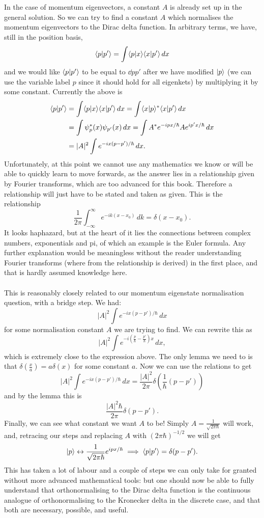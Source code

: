 \\\\
In the case of momentum eigenvectors, a constant $A$ is already set up in the general solution. So we can try to find a constant $A$ which normalises the momentum eigenvectors to the Dirac delta function. In arbitrary terms, we have, still in the position basis,
$$
\langle p|p'\rangle=\int\langle p|x\rangle\langle x|p'\rangle\,dx
$$
and we would like $\langle p|p'\rangle$ to be equal to $\dd{p}{p'}$ after we have modified $|p\rangle$ (we can use the variable label $p$ since it should hold for all eigenkets) by multiplying it by some constant. Currently the above is 
$$
\begin{aligned}
\langle p|p'\rangle&=\int\langle p|x\rangle\langle x|p'\rangle\,dx =\int\langle x|p\rangle^{\ast}\langle x|p'\rangle\,dx\\
&=\int\psi_{p}^{\ast}(x)\psi_{p'}(x)\,dx = \int A^{\ast}e^{-ipx/\hbar}Ae^{ip'x/\hbar}\,dx\\
&=|A|^{2}\int e^{-ix(p-p')/\hbar}\,dx.
\end{aligned}
$$
Unfortunately, at this point we cannot use any mathematics we know or will be able to quickly learn to move forwards, as the answer lies in a relationship given by Fourier transforms, which are too advanced for this book. Therefore a relationship will just have to be stated and taken as given. This is the relationship
$$
\frac{1}{2\pi}\int_{-\infty}^{\infty}e^{-ik(x-x_{0})}\,dk=\delta(x-x_{0}).
$$
It looks haphazard, but at the heart of it lies the connections between complex numbers, exponentials and pi, of which an example is the Euler formula. Any further explanation would be meaningless without the reader understanding Fourier transforms (where from the relationship is derived) in the first place, and that is hardly assumed knowledge here.
\\\\
This is reasonably closely related to our momentum eigenstate normalisation question, with a bridge step. We had:
$$
|A|^{2}\int e^{-ix(p-p')/\hbar}\,dx
$$
for some normalisation constant $A$ we are trying to find. We can rewrite this as 
$$
|A|^{2}\int e^{-i(\frac{p}{\hbar}-\frac{p'}{\hbar})x}\,dx,
$$
which is extremely close to the expression above. The only lemma we need to is that $\delta(\frac{x}{a})=a\delta(x)$ for some constant $a$. Now we can use the relations to get 
$$
|A|^{2}\int e^{-ix(p-p')/\hbar}\,dx=\frac{|A|^2}{2\pi}\delta\left(\frac{1}{\hbar}(p-p')\right)
$$
and by the lemma this is
$$
\frac{|A|^2\hbar}{2\pi}\delta(p-p').
$$
Finally, we can see what constant we want $A$ to be! Simply $A=\frac{1}{\sqrt{2\pi\hbar}}$ will work, and, retracing our steps and replacing $A$ with $(2\pi\hbar)^{-1/2}$ we will get
$$
|p\rangle\leftrightarrow\frac{1}{\sqrt{2\pi\hbar}}e^{ipx/\hbar}\implies\langle p|p'\rangle=\delta(p-p').
$$
This has taken a lot of labour and a couple of steps we can only take for granted without more advanced mathematical tools: but one should now be able to fully understand that orthonormalising to the Dirac delta function is the continuous analogue of orthonormalising to the Kronecker delta in the discrete case, and that both are necessary, possible, and useful.
